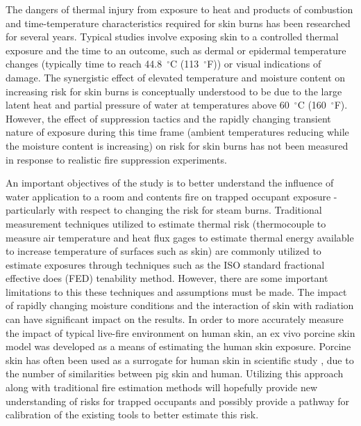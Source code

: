 \documentclass[12pt,oneside]{book}
\begin{document}
The dangers of thermal injury from exposure to heat and products of combustion and time-temperature characteristics required for skin burns has been researched for several years.  Typical studies involve exposing skin to a controlled thermal exposure and the time to an outcome, such as dermal or epidermal temperature changes (typically time to reach 44.8~$^\circ$C (113~$^\circ$F)) or visual indications of damage. The synergistic effect of elevated temperature and moisture content on increasing risk for skin burns is conceptually understood to be due to the large latent heat and partial pressure of water at temperatures above 60~$^\circ$C (160~$^\circ$F).  However, the effect of suppression tactics and the rapidly changing transient nature of exposure during this time frame (ambient temperatures reducing while the moisture content is increasing) on risk for skin burns has not been measured in response to realistic fire suppression experiments. 

An important objectives of the study is to better understand the influence of water application to a room and contents fire on trapped occupant exposure - particularly with respect to changing the risk for steam burns. Traditional measurement techniques utilized to estimate thermal risk (thermocouple to measure air temperature and heat flux gages to estimate thermal energy available to increase temperature of surfaces such as skin) are commonly utilized to estimate exposures through techniques such as the ISO standard fractional effective does (FED) tenability method.  However, there are some important limitations to this these techniques and assumptions must be made.  The impact of rapidly changing moisture conditions and the interaction of skin with radiation can have significant impact on the results.  In order to more accurately measure the impact of typical live-fire environment on human skin, an ex vivo porcine skin model was developed as a means of estimating the human skin exposure. Porcine skin has often been used as a surrogate for human skin in scientific study \cite{Pig_Experimental_model,Of_pigs_and_men,Sensitivity_Cross-reacting}, due to the number of similarities between pig skin and human.  Utilizing this approach along with traditional fire estimation methods will hopefully provide new understanding of risks for trapped occupants and possibly provide a pathway for calibration of the existing tools to better estimate this risk.   
\end{document}
